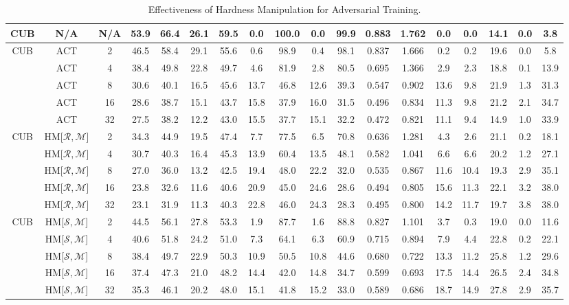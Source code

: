 \begin{table*}
{\begin{tabular}{c|cc|cccc|ccccc|ccccc|c}
CUB & N/A & N/A & 53.9 & 66.4 & 26.1 & 59.5 & 0.0 & 100.0 & 0.0 & 99.9 & 0.883 & 1.762 & 0.0 & 0.0 & 14.1 & 0.0 & 3.8\tabularnewline
\hline 
\multirow{5}{*}{CUB} & ACT & 2 & 46.5 & 58.4 & 29.1 & 55.6 & 0.6 & 98.9 & 0.4 & 98.1 & 0.837 & 1.666 & 0.2 & 0.2 & 19.6 & 0.0 & 5.8\tabularnewline
 & ACT & 4 & 38.4 & 49.8 & 22.8 & 49.7 & 4.6 & 81.9 & 2.8 & 80.5 & 0.695 & 1.366 & 2.9 & 2.3 & 18.8 & 0.1 & 13.9\tabularnewline
 & ACT & 8 & 30.6 & 40.1 & 16.5 & 45.6 & 13.7 & 46.8 & 12.6 & 39.3 & 0.547 & 0.902 & 13.6 & 9.8 & 21.9 & 1.3 & 31.3\tabularnewline
 & ACT & 16 & 28.6 & 38.7 & 15.1 & 43.7 & 15.8 & 37.9 & 16.0 & 31.5 & 0.496 & 0.834 & 11.3 & 9.8 & 21.2 & 2.1 & 34.7\tabularnewline
 & ACT & 32 & 27.5 & 38.2 & 12.2 & 43.0 & 15.5 & 37.7 & 15.1 & 32.2 & 0.472 & 0.821 & 11.1 & 9.4 & 14.9 & 1.0 & 33.9\tabularnewline
\hline 
\multirow{5}{*}{CUB} & HM{[}$\mathcal{R},\mathcal{M}${]} & 2 & 34.3 & 44.9 & 19.5 & 47.4 & 7.7 & 77.5 & 6.5 & 70.8 & 0.636 & 1.281 & 4.3 & 2.6 & 21.1 & 0.2 & 18.1\tabularnewline
 & HM{[}$\mathcal{R},\mathcal{M}${]} & 4 & 30.7 & 40.3 & 16.4 & 45.3 & 13.9 & 60.4 & 13.5 & 48.1 & 0.582 & 1.041 & 6.6 & 6.6 & 20.2 & 1.2 & 27.1\tabularnewline
 & HM{[}$\mathcal{R},\mathcal{M}${]} & 8 & 27.0 & 36.0 & 13.2 & 42.5 & 19.4 & 48.0 & 22.2 & 32.0 & 0.535 & 0.867 & 11.6 & 10.4 & 19.3 & 2.9 & 35.1\tabularnewline
 & HM{[}$\mathcal{R},\mathcal{M}${]}  & 16 & 23.8 & 32.6 & 11.6 & 40.6 & 20.9 & 45.0 & 24.6 & 28.6 & 0.494 & 0.805 & 15.6 & 11.3 & 22.1 & 3.2 & 38.0\tabularnewline
 & HM{[}$\mathcal{R},\mathcal{M}${]} & 32 & 23.1 & 31.9 & 11.3 & 40.3 & 22.8 & 46.0 & 24.3 & 28.3 & 0.495 & 0.800 & 14.2 & 11.7 & 19.7 & 3.8 & 38.0\tabularnewline
\hline 
\multirow{5}{*}{CUB} & HM{[}$\mathcal{S},\mathcal{M}${]} & 2 & 44.5 & 56.1 & 27.8 & 53.3 & 1.9 & 87.7 & 1.6 & 88.8 & 0.827 & 1.101 & 3.7 & 0.3 & 19.0 & 0.0 & 11.6\tabularnewline
 & HM{[}$\mathcal{S},\mathcal{M}${]} & 4 & 40.6 & 51.8 & 24.2 & 51.0 & 7.3 & 64.1 & 6.3 & 60.9 & 0.715 & 0.894 & 7.9 & 4.4 & 22.8 & 0.2 & 22.1\tabularnewline
 & HM{[}$\mathcal{S},\mathcal{M}${]} & 8 & 38.4 & 49.7 & 22.9 & 50.3 & 10.9 & 50.5 & 10.8 & 44.6 & 0.680 & 0.722 & 13.3 & 11.2 & 25.8 & 1.2 & 29.6\tabularnewline
 & HM{[}$\mathcal{S},\mathcal{M}${]} & 16 & 37.4 & 47.3 & 21.0 & 48.2 & 14.4 & 42.0 & 14.8 & 34.7 & 0.599 & 0.693 & 17.5 & 14.4 & 26.5 & 2.4 & 34.8\tabularnewline
 & HM{[}$\mathcal{S},\mathcal{M}${]} & 32 & 35.3 & 46.1 & 20.2 & 48.0 & 15.1 & 41.8 & 15.2 & 33.0 & 0.589 & 0.686 & 18.7 & 14.9 & 27.8 & 2.9 & 35.7\tabularnewline

	\bottomrule

\end{tabular}

}

\caption{Effectiveness of Hardness Manipulation for Adversarial Training.}
\label{tab:hmeff}
\end{table*}
